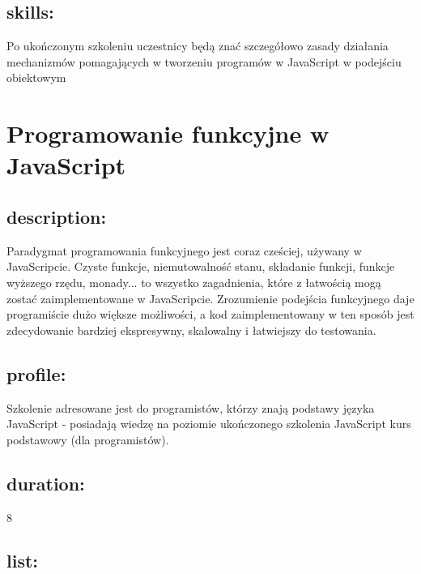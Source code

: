 \documentclass{article}[10pt]
\begin{document}
	\subsection*{skills:}
\begin{adjustwidth}{2cm}{}
	
Po ukończonym szkoleniu uczestnicy będą znać szczegółowo zasady działania mechanizmów pomagających w tworzeniu programów w JavaScript w podejściu obiektowym
\end{adjustwidth}

\newpage


    
	\section{Programowanie funkcyjne w JavaScript}

	\subsection*{description:}
	\begin{adjustwidth}{2cm}{}
		 Paradygmat programowania funkcyjnego jest coraz cześciej, używany w JavaScripcie. Czyste funkcje, niemutowalność stanu, składanie funkcji, funkcje wyższego rzędu, monady... to wszystko zagadnienia, które z łatwością mogą zostać zaimplementowane w JavaScripcie.
 Zrozumienie podejścia funkcyjnego daje programiście dużo większe możliwości, a kod zaimplementowany w ten sposób jest zdecydowanie bardziej ekspresywny, skalowalny i łatwiejszy do testowania.

	\end{adjustwidth}
	\subsection*{profile:}
\begin{adjustwidth}{2cm}{}
	
Szkolenie adresowane jest do programistów, którzy znają podstawy języka JavaScript  - posiadają wiedzę na poziomie ukończonego szkolenia JavaScript kurs podstawowy (dla programistów).
\end{adjustwidth}
	\subsection*{duration:}
\begin{adjustwidth}{2cm}{}
	8
\end{adjustwidth}

	\subsection*{list:}
\begin{adjustwidth}{1.5cm}{}
	\begin{itemize}











	\end{itemize}
\end{adjustwidth}
\end{document}
